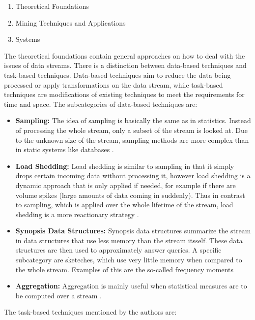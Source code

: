 \begin{enumerate}
	\item Theoretical Foundations
	\item Mining Techniques and Applications
	\item Systems
\end{enumerate}

The theoretical foundations contain general approaches on how to deal with the issues of data streams. There is a distinction between data-based techniques and task-based techniques. Data-based techniques aim to reduce the data being processed or apply transformations on the data stream, while task-based techniques are modifications of existing techniques to meet the requirements for time and space. The subcategories of data-based techniques are:

\begin{itemize}
	\item \textbf{Sampling:} The idea of sampling is basically the same as in statistics. Instead of processing the whole stream, only a subset of the stream is looked at. Due to the unknown size of the stream, sampling methods are more complex than in static systems like databases \cite{manku1999random}. 
	\item \textbf{Load Shedding:} Load shedding is similar to sampling in that it simply drops certain incoming data without processing it, however load shedding is a dynamic approach that is only applied if needed, for example if there are volume spikes (large amounts of data coming in suddenly). Thus in contrast to sampling, which is applied over the whole lifetime of the stream, load shedding is a more reactionary strategy \cite{babcock2003load}.
	\item \textbf{Synopsis Data Structures:} Synopsis data structures summarize the stream in data structures that use less memory than the stream itsself. These data structures are then used to approximately answer queries. A specific subcategory are sketeches, which use very little memory when compared to the whole stream. Examples of this are the so-called frequency moments \cite{babcock2002models}
	\item \textbf{Aggregation:} Aggregation is mainly useful when statistical measures are to be computed over a stream \cite{zhang2002temporal}.
\end{itemize}

The task-based techniques mentioned by the authors are:

